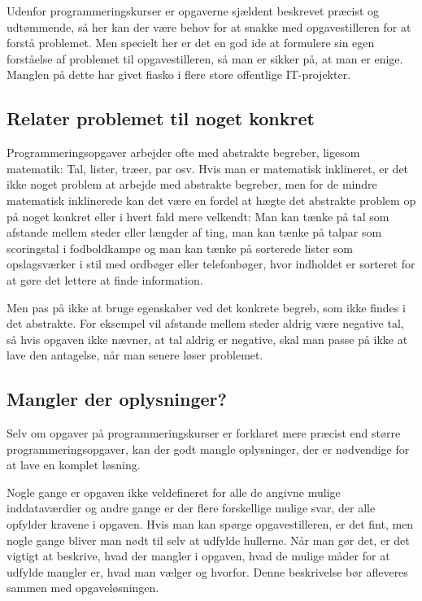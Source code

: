 \documentclass[a4paper,12pt]{article}
\begin{document}
Udenfor programmeringskurser er opgaverne sjældent beskrevet præcist
og udtømmende, så her kan der være behov for at snakke med
opgavestilleren for at forstå problemet.  Men specielt her er det en
god ide at formulere sin egen forståelse af problemet til
opgavestilleren, så man er sikker på, at man er enige.  Manglen på
dette har givet fiasko i flere store offentlige IT-projekter.

\subsection*{Relater problemet til noget konkret}

Programmeringsopgaver arbejder ofte med abstrakte begreber, ligesom
matematik: Tal, lister, træer, par osv.  Hvis man er matematisk
inklineret, er det ikke noget problem at arbejde med abstrakte
begreber, men for de mindre matematisk inklinerede kan det være en
fordel at hægte det abstrakte problem op på noget konkret eller i
hvert fald mere velkendt: Man kan tænke på tal som afstande mellem
steder eller længder af ting, man kan tænke på talpar som scoringstal
i fodboldkampe og man kan tænke på sorterede lister som opslagsværker
i stil med ordbøger eller telefonbøger, hvor indholdet er sorteret for
at gøre det lettere at finde information.

Men pas på ikke at bruge egenskaber ved det konkrete begreb, som ikke
findes i det abstrakte.  For eksempel vil afstande mellem steder
aldrig være negative tal, så hvis opgaven ikke nævner, at tal aldrig
er negative, skal man passe på ikke at lave den antagelse, når man
senere løser problemet.

\subsection*{Mangler der oplysninger?}

Selv om opgaver på programmeringskurser er forklaret mere præcist end
større programmeringsopgaver, kan der godt mangle oplysninger, der er
nødvendige for at lave en komplet løsning.

Nogle gange er opgaven ikke veldefineret for alle de angivne mulige
inddataværdier og andre gange er der flere forskellige mulige svar,
der alle opfylder kravene i opgaven.  Hvis man kan spørge
opgavestilleren, er det fint, men nogle gange bliver man nødt til selv
at udfylde hullerne.  Når man gør det, er det vigtigt at beskrive,
hvad der mangler i opgaven, hvad de mulige måder for at udfylde
mangler er, hvad man vælger og hvorfor.  Denne beskrivelse bør
afleveres sammen med opgaveløsningen.
\end{document}

